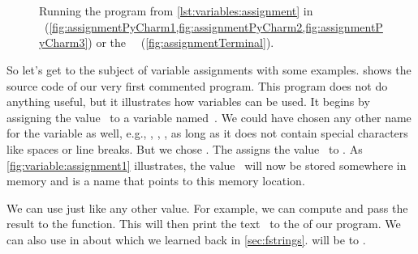 %
\begin{figure}[tb]%
\centering%
%
%
\hfill%
%
%
\\%
%
%
\\%
%
%
%
\caption{Running the program  from \cref{lst:variables:assignment} in \pycharm~(\cref{fig:assignmentPyCharm1,fig:assignmentPyCharm2,fig:assignmentPyCharm3}) or the \ubuntu\ ~(\cref{fig:assignmentTerminal}).}%
\label{fig:variables:assignment}%
\end{figure}%
%
So let's get to the subject of variable assignments with some examples.
 shows the source code of our very first commented program.
This program does not do anything useful, but it illustrates how variables can be used.
It begins by assigning the  value~ to a variable named~.
We could have chosen any other name for the variable as well, e.g., , , , as long as it does not contain special characters like spaces or line breaks.
But we chose .
The \pythonilIdx{=} assigns the value~ to .
As \cref{fig:variable:assignment1} illustrates, the value~ will now be stored somewhere in memory and  is a name that points to this memory location.%
%
\begin{sloppypar}%
We can use  just like any other value.
For example, we can compute  and pass the result to the  function.
This will then print the text~ to the  of our program.
We can also use  in  about which we learned back in \cref{sec:fstrings}.
 will be  to .%
\end{sloppypar}%
